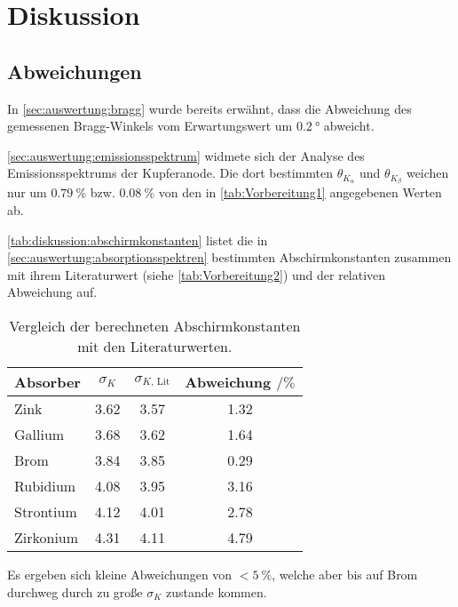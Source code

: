 \section{Diskussion}

\subsection{Abweichungen}

In \autoref{sec:auswertung:bragg} wurde bereits erwähnt,
dass die Abweichung des gemessenen Bragg-Winkels vom Erwartungswert
um $\SI{0.2}{\degree}$ abweicht.


\autoref{sec:auswertung:emissionsspektrum} widmete sich der Analyse des Emissionsspektrums der Kupferanode.
Die dort bestimmten $\theta_{K_\alpha}$ und $\theta_{K_\beta}$ weichen nur um
$\SI{0.79}{\percent}$ bzw. $\SI{0.08}{\percent}$ von den in \autoref{tab:Vorbereitung1} angegebenen Werten ab.


\autoref{tab:diskussion:abschirmkonstanten} listet die in \autoref{sec:auswertung:absorptionsspektren} bestimmten Abschirmkonstanten
zusammen mit ihrem Literaturwert (siehe \autoref{tab:Vorbereitung2}) und der relativen Abweichung auf.

\begin{table}
    \centering
    \caption{Vergleich der berechneten Abschirmkonstanten mit den Literaturwerten.}
    \label{tab:diskussion:abschirmkonstanten}
    \begin{tabular}{l S[table-format=1.2] S[table-format=1.2] S[table-format=1.2]}
    \toprule
    Absorber &
    {$\sigma_K$} &
    {$\sigma_{K\text{, Lit}}$} &
    {Abweichung $\mathbin{/} \si{\percent}$} \\
    \midrule
    Zink      & 3.62 & 3.57 & 1.32 \\
    Gallium   & 3.68 & 3.62 & 1.64 \\
    Brom      & 3.84 & 3.85 & 0.29 \\
    Rubidium  & 4.08 & 3.95 & 3.16 \\
    Strontium & 4.12 & 4.01 & 2.78 \\
    Zirkonium & 4.31 & 4.11 & 4.79 \\
    \bottomrule
    \end{tabular}
\end{table}

Es ergeben sich kleine Abweichungen von $< \SI{5}{\percent}$,
welche aber bis auf Brom durchweg durch zu große $\sigma_K$ zustande kommen.



